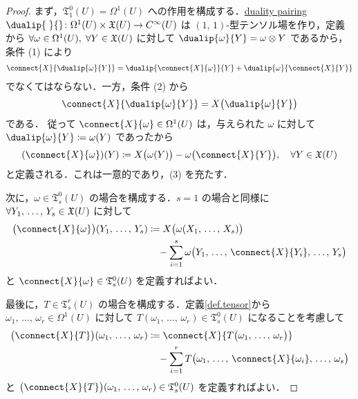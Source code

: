 \documentclass[geometry_main]{subfiles}
\begin{document}
\begin{proof} 
	まず，$\mathfrak{T}^0_1(U) = \Omega^1(U)$ への作用を構成する．\underline{duality pairing} $\dualip{\;}{} \colon \Omega^1(U) \times \vecfield{U} \to \cinftyf{U}$ は $(1,\, 1)$-型テンソル場を作り，定義から $\forall \omega \in \Omega^1(U),\; \forall Y \in \mathfrak{X}(U)$ に対して $\dualip{\omega}{Y} = \omega \otimes Y$ であるから，条件 (1) により
	\begin{align} 
		\connect{X}{\dualip{\omega}{Y}} = \dualip{\connect{X}{\omega}}{Y} + \dualip{\omega}{\connect{X}{Y}}
	\end{align}
	でなくてはならない．一方，条件 (2) から
	\begin{align} 
		\connect{X}{\dualip{\omega}{Y}} = X \bigl(  \dualip{\omega}{Y} \bigr) 
	\end{align}
	である．
	従って $\connect{X}{\omega} \in \Omega^1(U)$ は，与えられた $\omega$ に対して $\dualip{\omega}{Y} \coloneqq \omega(Y)$ であったから
	\begin{align} 
		(\connect{X}{\omega})(Y) \coloneqq X \bigl( \omega(Y) \bigr) - \omega \bigl( \connect{X}{Y} \bigr),\quad \forall Y \in \vecfield{U}
	\end{align}
	と定義される．これは一意的であり，(3) を充たす．

	次に，$\omega \in \mathfrak{T}^0_s (U)$ の場合を構成する．$s=1$ の場合と同様に $\forall Y_1,\, \dots ,\, Y_s \in \mathfrak{X}(U)$ に対して
	\begin{align} 
		\bigl( \connect{X}{\omega} \bigr)(Y_1,\, \dots ,\, Y_s)
		&\coloneqq X \bigl( \omega(X_1,\, \dots ,\, X_s) \bigr) \\
		&\quad - \sum_{i=1}^s \omega \bigl(Y_1,\, \dots ,\, \connect{X}{Y_i},\, \dots ,\, Y_s \bigr)
	\end{align}
	と $\connect{X}{\omega} \in \mathfrak{T}^0_s (U)$ を定義すればよい．

	最後に，$T \in \mathfrak{T}^r_s (U)$ の場合を構成する．定義\ref{def.tensor}から $\omega_1,\, \dots ,\, \omega_r \in \Omega^1(U)$ に対して $T(\omega_1,\, \dots ,\, \omega_r) \in \mathfrak{T}^0_s(U)$ になることを考慮して
	\begin{align} 
		\bigl( \connect{X}{T} \bigr)(\omega_1,\, \dots ,\, \omega_r)
		&\coloneqq \connect{X}{ T\bigl( \omega_1,\, \dots ,\, \omega_r \bigr) } \\
		&\quad - \sum_{i=1}^r T \bigl(\omega_1,\, \dots ,\, \connect{X}{\omega_i},\, \dots ,\, \omega_s \bigr)
	\end{align}
	と $\bigl( \connect{X}{T} \bigr)(\omega_1,\, \dots ,\, \omega_r) \in \mathfrak{T}^0_s(U)$ を定義すればよい．
\end{proof}
\end{document}
